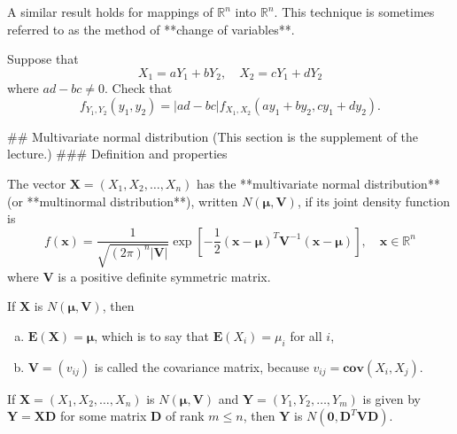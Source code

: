 A similar result holds for mappings of $\mathbb{R}^n$ into $\mathbb{R}^n$. This technique is sometimes referred to as the method of **change of variables**. 

\begin{example}
Suppose that 
\begin{equation*}
    X_{1}=a Y_{1}+b Y_{2}, \quad X_{2}=c Y_{1}+d Y_{2}
\end{equation*}
where $ad-bc \neq 0$. Check that 
\begin{equation*}
    f_{Y_{1}, Y_{2}}\left(y_{1}, y_{2}\right) = |a d-b c| f_{X_{1}, X_{2}}\left(a y_{1}+b y_{2}, c y_{1}+d y_{2}\right).
\end{equation*}
\end{example}


## Multivariate normal distribution
(This section is the supplement of the lecture.)
### Definition and properties
\begin{definition}
The vector $\mathbf{X} = (X_1 , X_2 , \dots , X_n )$ has the **multivariate normal distribution** (or **multinormal distribution**), written $N(\boldsymbol{\mu}, \mathbf{V})$, if its joint density function is 
\begin{equation*}
    f(\mathbf{x})=\frac{1}{\sqrt{(2 \pi)^{n}|\mathbf{V}|}} \exp \left[-\frac{1}{2}(\mathbf{x}-\boldsymbol{\mu})^T \mathbf{V}^{-1}(\mathbf{x}-\boldsymbol{\mu}) \right], \quad \mathbf{x} \in \mathbb{R}^{n}
\end{equation*}
where $\mathbf{V}$ is a positive definite symmetric matrix. 
\end{definition}

\begin{theorem}
If $\mathbf{X}$ is $N(\boldsymbol{\mu}, \mathbf{V})$, then 
\begin{enumerate}[(a)]
    \item $\mathbf{E}(\mathbf{X}) = \boldsymbol{\mu}$, which is to say that $\mathbf{E}(X_i) = \mu_i$ for all $i$,
    \item $\mathbf{V} = (v_{ij})$ is called the covariance matrix, because $v_{ij} = \mathbf{cov}(X_i , X_j)$. 
\end{enumerate}
\end{theorem}

\begin{theorem}
If $\mathbf{X}=\left(X_{1}, X_{2}, \dots, X_{n}\right)$ is $N(\boldsymbol{\mu}, \mathbf{V})$ and $\mathbf{Y}=\left(Y_{1}, Y_{2}, \dots, Y_{m}\right)$ is given by $\mathbf{Y} = \mathbf{XD}$ for some matrix $\mathbf{D}$ of rank $m \leq n$, then $\mathbf{Y}$ is $N\left(\mathbf{0}, \mathbf{D}^T \mathbf{V} \mathbf{D}\right)$.
\end{theorem}


